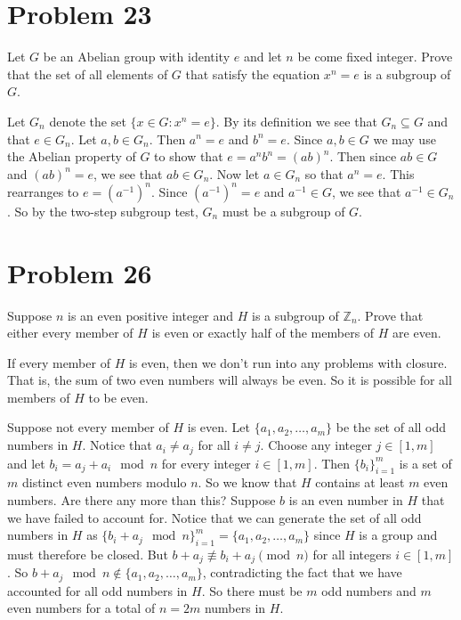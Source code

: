 \documentclass{article}
\begin{document}
\section*{Problem 23}

Let $G$ be an Abelian group with identity $e$ and let $n$ be come
fixed integer.  Prove that the set of all elements of $G$ that
satisfy the equation $x^n=e$ is a subgroup of $G$.

Let $G_n$ denote the set $\{x\in G:x^n=e\}$.  By its definition
we see that $G_n\subseteq G$ and that $e\in G_n$.
Let $a,b\in G_n$.  Then $a^n=e$ and $b^n=e$.  Since $a,b\in G$
we may use the Abelian property of $G$ to show that
$e = a^nb^n = (ab)^n$.  Then since $ab\in G$ and $(ab)^n=e$,
we see that $ab\in G_n$.  Now let $a\in G_n$ so that $a^n=e$.
This rearranges to $e=(a^{-1})^n$.  Since $(a^{-1})^n=e$ and
$a^{-1}\in G$, we see that $a^{-1}\in G_n$.  So by the two-step
subgroup test, $G_n$ must be a subgroup of $G$.

\section*{Problem 26}

Suppose $n$ is an even positive integer and $H$ is a subgroup of $\mathbb{Z}_n$.
Prove that either every member of $H$ is even or exactly half of the members of $H$
are even.

If every member of $H$ is even, then we don't run into any problems with
closure.  That is, the sum of two even numbers will always be even.  So it
is possible for all members of $H$ to be even.

Suppose not every member of $H$ is even.  Let $\{a_1,a_2,\dots,a_m\}$
be the set of all odd numbers in $H$.  Notice that $a_i\neq a_j$ for
all $i\neq j$.  Choose any integer $j\in[1,m]$ and let $b_i=a_j+a_i\mod{n}$
for every integer $i\in[1,m]$.  Then $\{b_i\}_{i=1}^m$ is a set of
$m$ distinct even numbers modulo $n$.  So we know that $H$ contains at least $m$
even numbers.  Are there any more than this?  Suppose $b$ is an even number
in $H$ that we have failed to account for.  Notice that we can generate the
set of all odd numbers in $H$ as $\{b_i+a_j\mod{n}\}_{i=1}^m=\{a_1,a_2,\dots,a_m\}$
since $H$ is a group and must therefore be closed.  But
$b+a_j\not\equiv b_i+a_j\pmod{n}$ for all integers $i\in[1,m]$.  So
$b+a_j\mod{n}\not\in\{a_1,a_2,\dots,a_m\}$, contradicting the fact that
we have accounted for all odd numbers in $H$.  So there must be $m$ odd
numbers and $m$ even numbers for a total of $n=2m$ numbers in $H$.
\end{document}
